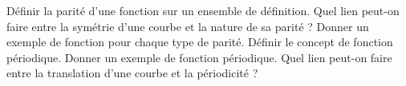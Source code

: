 %
%
	\begin{tasks}
		\task Définir la parité d'une fonction sur un ensemble de définition.
		\task Quel lien peut-on faire entre la symétrie d'une courbe et la nature de sa parité ?
		\task Donner un exemple de fonction pour chaque type de parité.
		\task Définir le concept de fonction périodique.
		\task Donner un exemple de fonction périodique.
		\task Quel lien peut-on faire entre la translation d'une courbe et la périodicité ?
	\end{tasks}
